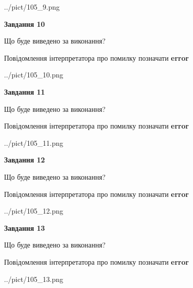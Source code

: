 \documentclass[11pt, ukrainian]{article}
\begin{document}
{\begin {large}
\begin{center}
	{../pict/105_9.png}
\end{center}
\newpage

{\begin {center}\textbf{Завдання 10}\end {center}}\par
Що буде виведено за виконання? \par
Повідомлення інтерпретатора про помилку позначати \textbf{error}

\begin{center}
	{../pict/105_10.png}
\end{center}
\newpage

{\begin {center}\textbf{Завдання 11}\end {center}}\par
Що буде виведено за виконання? \par
Повідомлення інтерпретатора про помилку позначати \textbf{error}

\begin{center}
	{../pict/105_11.png}
\end{center}
\newpage

{\begin {center}\textbf{Завдання 12}\end {center}}\par
Що буде виведено за виконання? \par
Повідомлення інтерпретатора про помилку позначати \textbf{error}

\begin{center}
	{../pict/105_12.png}
\end{center}
\newpage

{\begin {center}\textbf{Завдання 13}\end {center}}\par
Що буде виведено за виконання? \par
Повідомлення інтерпретатора про помилку позначати \textbf{error}

\begin{center}
	{../pict/105_13.png}
\end{center}
\newpage


\end{large}}
\end{document}
